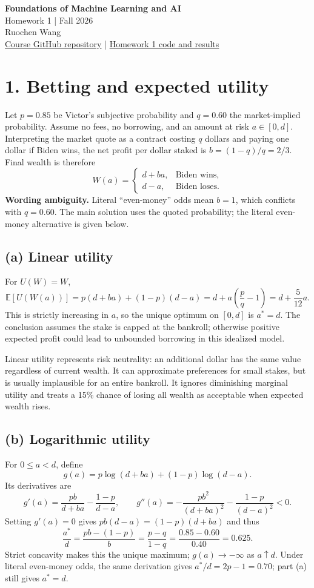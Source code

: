 \documentclass[10pt,letterpaper]{article}
\newcommand{\E}{\mathbb{E}}
\begin{document}
\begin{center}
{\Large\bfseries Foundations of Machine Learning and AI}\\[4pt]
{\large Homework 1 \quad | \quad Fall 2026}\\[4pt]
{\large Ruochen Wang}
\\[4pt]
{\small \href{https://github.com/richard0525/foundations-machine-learning-ai}{Course GitHub repository}
\quad | \quad
\href{https://github.com/richard0525/foundations-machine-learning-ai/tree/main/homework_1}{Homework 1 code and results}}
\end{center}

\section*{1. Betting and expected utility}
Let $p=0.85$ be Victor's subjective probability and $q=0.60$ the market-implied
probability. Assume no fees, no borrowing, and an amount at risk $a\in[0,d]$.
Interpreting the market quote as a contract costing $q$ dollars and paying one
dollar if Biden wins, the net profit per dollar staked is
$b=(1-q)/q=2/3$. Final wealth is therefore
\[
W(a)=\begin{cases}d+ba,&\text{Biden wins},\\d-a,&\text{Biden loses}.\end{cases}
\]
\textbf{Wording ambiguity.} Literal ``even-money'' odds mean $b=1$, which conflicts
with $q=0.60$. The main solution uses the quoted probability; the literal
even-money alternative is given below.

\subsection*{(a) Linear utility}
For $U(W)=W$,
\[
\E[U(W(a))]=p(d+ba)+(1-p)(d-a)
=d+a\left(\frac{p}{q}-1\right)=d+\frac{5}{12}a.
\]
This is strictly increasing in $a$, so the unique optimum on $[0,d]$ is
$\boxed{a^*=d}$. The conclusion assumes the stake is capped at the bankroll;
otherwise positive expected profit could lead to unbounded borrowing in this
idealized model.

Linear utility represents risk neutrality: an additional dollar has the same
value regardless of current wealth. It can approximate preferences for small
stakes, but is usually implausible for an entire bankroll. It ignores diminishing
marginal utility and treats a 15\% chance of losing all wealth as acceptable
when expected wealth rises.

\subsection*{(b) Logarithmic utility}
For $0\le a<d$, define
\[
g(a)=p\log(d+ba)+(1-p)\log(d-a).
\]
Its derivatives are
\[
g'(a)=\frac{pb}{d+ba}-\frac{1-p}{d-a},\qquad
g''(a)=-\frac{pb^2}{(d+ba)^2}-\frac{1-p}{(d-a)^2}<0.
\]
Setting $g'(a)=0$ gives $pb(d-a)=(1-p)(d+ba)$ and thus
\[
\boxed{\frac{a^*}{d}=\frac{pb-(1-p)}{b}
=\frac{p-q}{1-q}=\frac{0.85-0.60}{0.40}=0.625.}
\]
Strict concavity makes this the unique maximum; $g(a)\to-\infty$ as $a\uparrow d$.
Under literal even-money odds, the same derivation gives
$a^*/d=2p-1=0.70$; part (a) still gives $a^*=d$.
\end{document}
